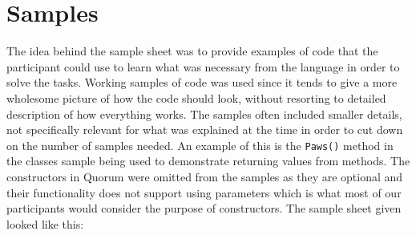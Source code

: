 \section{Samples}
The idea behind the sample sheet was to provide examples of code that the participant could use to learn what was necessary from the language in order to solve the tasks.
Working samples of code was used since it tends to give a more wholesome picture of how the code should look, without resorting to detailed description of how everything works.
The samples often included smaller details, not specifically relevant for what was explained at the time in order to cut down on the number of samples needed.
An example of this is the \lstinline!Paws()! method in the classes sample being used to demonstrate returning values from methods.
The constructors in Quorum were omitted from the samples as they are optional and their functionality does not support using parameters which is what most of our participants would consider the purpose of constructors.
The sample sheet given looked like this:%

